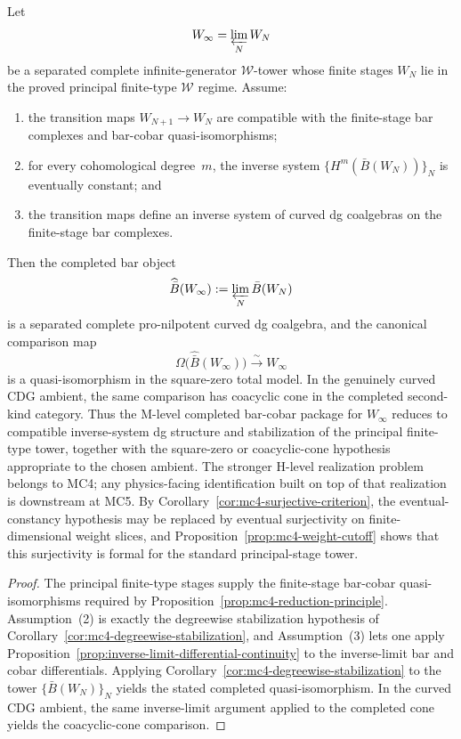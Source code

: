 \begin{proposition}
\label{prop:winfty-mc4-criterion}
Let
\[
W_\infty = \varprojlim_N W_N
\]
be a separated complete infinite-generator $\mathcal{W}$-tower whose
finite stages $W_N$ lie in the proved principal finite-type
$\mathcal{W}$ regime. Assume:
\begin{enumerate}
\item the transition maps $W_{N+1} \to W_N$ are compatible with the
 finite-stage bar complexes and bar-cobar quasi-isomorphisms;
\item for every cohomological degree~$m$, the inverse system
 $\{H^m(\bar B(W_N))\}_N$ is eventually constant; and
\item the transition maps define an inverse system of curved dg
 coalgebras on the finite-stage bar complexes.
\end{enumerate}
Then the completed bar object
\[
\widehat{\bar B}(W_\infty) := \varprojlim_N \bar B(W_N)
\]
is a separated complete pro-nilpotent curved dg coalgebra, and the
canonical comparison map
\[
\Omega\bigl(\widehat{\bar B}(W_\infty)\bigr) \xrightarrow{\sim} W_\infty
\]
is a quasi-isomorphism in the square-zero total model. In the
genuinely curved CDG ambient, the same comparison has coacyclic cone
in the completed second-kind category. Thus the M-level completed
bar-cobar package for $W_\infty$ reduces to compatible inverse-system
dg structure and stabilization of the principal finite-type tower,
together with the square-zero or coacyclic-cone hypothesis appropriate
to the chosen ambient. The stronger H-level realization problem
belongs to MC4; any physics-facing identification built on top of that
realization is downstream at MC5. By
Corollary~\ref{cor:mc4-surjective-criterion}, the eventual-constancy
hypothesis may be replaced by eventual surjectivity on finite-dimensional
weight slices, and Proposition~\ref{prop:mc4-weight-cutoff} shows that
this surjectivity is formal for the standard principal-stage tower.
\end{proposition}

\begin{proof}
The principal finite-type stages supply the finite-stage bar-cobar
quasi-isomorphisms required by
Proposition~\ref{prop:mc4-reduction-principle}. Assumption~\textup{(2)}
is exactly the degreewise stabilization hypothesis of
Corollary~\ref{cor:mc4-degreewise-stabilization}, and
Assumption~\textup{(3)} lets one apply
Proposition~\ref{prop:inverse-limit-differential-continuity} to the
inverse-limit bar and cobar differentials. Applying
Corollary~\ref{cor:mc4-degreewise-stabilization} to the tower
$\{\bar B(W_N)\}_N$ yields the stated completed quasi-isomorphism.
In the curved CDG ambient, the same inverse-limit argument applied to
the completed cone yields the coacyclic-cone comparison.
\end{proof}

